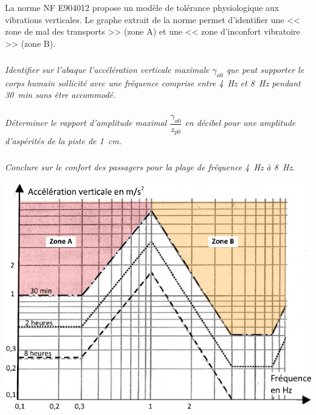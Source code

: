 \documentclass[10pt,fleqn]{article} %
\begin{document}
\begin{multicols}{2}
La norme NF E904012 propose un modèle de tolérance physiologique aux vibrations verticales. Le graphe extrait de la norme permet d’identifier une << zone de mal des transports >> (zone A) et une << zone d’inconfort vibratoire >> (zone B).

\subparagraph{}
\textit{Identifier sur l’abaque l’accélération 
verticale maximale $\gamma_{a0}$
que peut supporter le corps humain 
sollicité avec une fréquence comprise 
entre \SI{4}{Hz} et \SI{8}{Hz} 
pendant \SI{30}{min} sans être accommodé.
}
\ifprof
\begin{corrige}
\end{corrige}
\else
\fi


\subparagraph{}
\textit{Déterminer le rapport d’amplitude maximal $\dfrac{\gamma_{a0}}{z_{p0}}$
en décibel pour une amplitude d’aspérités de la piste de \SI{1}{cm}.}
\ifprof
\begin{corrige}
\end{corrige}
\else
\fi


\subparagraph{}
\textit{Conclure sur le confort des passagers pour la plage de fréquence \SI{4}{Hz} à \SI{8}{Hz}.}
\ifprof
\begin{corrige}
\end{corrige}
\else
\fi


\begin{center}
\includegraphics[width=\linewidth]{images/img_07}
\end{center}


\ifprof
\else
\end{multicols}
\fi
\end{document}
